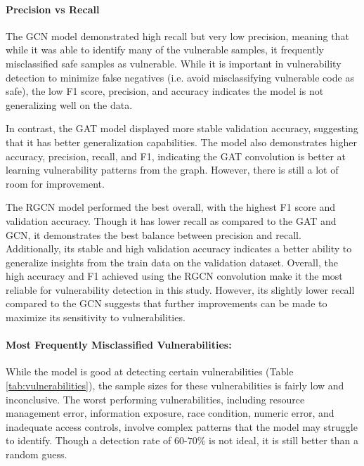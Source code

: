\documentclass{article}
\begin{document}
\paragraph{Precision vs Recall}
The GCN model demonstrated high recall but very low precision, meaning that while it was able to identify many of the vulnerable samples, it frequently misclassified safe samples as vulnerable. While it is important in vulnerability detection to minimize false negatives (i.e. avoid misclassifying vulnerable code as safe), the low F1 score, precision, and accuracy indicates the model is not generalizing well on the data.

In contrast, the GAT model displayed more stable validation accuracy, suggesting that it has better generalization capabilities. The model also demonstrates higher accuracy, precision, recall, and F1, indicating the GAT convolution is better at learning vulnerability patterns from the graph. However, there is still a lot of room for improvement.

The RGCN model performed the best overall, with the highest F1 score and validation accuracy. Though it has lower recall as compared to the GAT and GCN, it demonstrates the best balance between precision and recall. Additionally, its stable and high validation accuracy indicates a better ability to generalize insights from the train data on the validation dataset. Overall, the high accuracy and F1 achieved using the RGCN convolution make it the most reliable for vulnerability detection in this study. However, its slightly lower recall compared to the GCN suggests that further improvements can be made to maximize its sensitivity to vulnerabilities.

\paragraph{Most Frequently Misclassified Vulnerabilities:} While the model is good at detecting certain vulnerabilities (Table \ref{tab:vulnerabilities}), the sample sizes for these vulnerabilities is fairly low and inconclusive. The worst performing vulnerabilities, including resource management error, information exposure, race condition, numeric error, and inadequate access controls, involve complex patterns that the model may struggle to identify. Though a detection rate of $60$-$70$\% is not ideal, it is still better than a random guess. 
\end{document}
